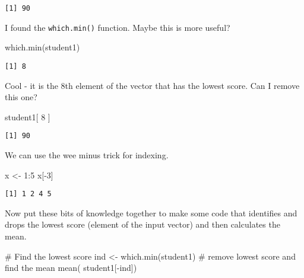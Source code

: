 \documentclass[
  letterpaper,
  DIV=11,
  numbers=noendperiod]{scrartcl}
\newenvironment{Shaded}{\begin{snugshade}}{\end{snugshade}}
\newcommand{\CommentTok}[1]{\textcolor[rgb]{0.37,0.37,0.37}{#1}}
\newcommand{\DecValTok}[1]{\textcolor[rgb]{0.68,0.00,0.00}{#1}}
\newcommand{\FunctionTok}[1]{\textcolor[rgb]{0.28,0.35,0.67}{#1}}
\newcommand{\NormalTok}[1]{\textcolor[rgb]{0.00,0.23,0.31}{#1}}
\newcommand{\OtherTok}[1]{\textcolor[rgb]{0.00,0.23,0.31}{#1}}
\newcommand{\SpecialCharTok}[1]{\textcolor[rgb]{0.37,0.37,0.37}{#1}}
\begin{document}
\begin{verbatim}
[1] 90
\end{verbatim}

I found the \texttt{which.min()} function. Maybe this is more useful?

\begin{Shaded}
\begin{Highlighting}[]
\FunctionTok{which.min}\NormalTok{(student1)}
\end{Highlighting}
\end{Shaded}

\begin{verbatim}
[1] 8
\end{verbatim}

Cool - it is the 8th element of the vector that has the lowest score.
Can I remove this one?

\begin{Shaded}
\begin{Highlighting}[]
\NormalTok{student1[ }\DecValTok{8}\NormalTok{ ]}
\end{Highlighting}
\end{Shaded}

\begin{verbatim}
[1] 90
\end{verbatim}

We can use the wee minus trick for indexing.

\begin{Shaded}
\begin{Highlighting}[]
\NormalTok{x }\OtherTok{\textless{}{-}} \DecValTok{1}\SpecialCharTok{:}\DecValTok{5}
\NormalTok{x[}\SpecialCharTok{{-}}\DecValTok{3}\NormalTok{]}
\end{Highlighting}
\end{Shaded}

\begin{verbatim}
[1] 1 2 4 5
\end{verbatim}

Now put these bits of knowledge together to make some code that
identifies and drops the lowest score (element of the input vector) and
then calculates the mean.

\begin{Shaded}
\begin{Highlighting}[]
\CommentTok{\# Find the lowest score}
\NormalTok{ind }\OtherTok{\textless{}{-}} \FunctionTok{which.min}\NormalTok{(student1)}
\CommentTok{\# remove lowest score and find the mean}
\FunctionTok{mean}\NormalTok{( student1[}\SpecialCharTok{{-}}\NormalTok{ind])}
\end{Highlighting}
\end{Shaded}
\end{document}
